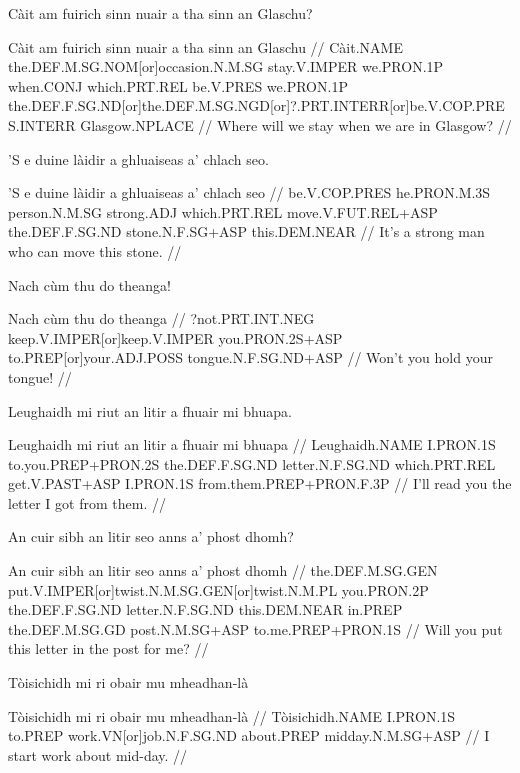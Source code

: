 \documentclass[a4paper,10pt]{article}
\begin{document}
\ex
\begingl
\glpre Càit am fuirich sinn nuair a tha sinn an Glaschu? 

\vspace{4mm}
\gla Càit am fuirich sinn nuair a tha sinn an Glaschu  //
\glb Càit.NAME the.DEF.M.SG.NOM[or]occasion.N.M.SG stay.V.IMPER we.PRON.1P when.CONJ which.PRT.REL be.V.PRES we.PRON.1P the.DEF.F.SG.ND[or]the.DEF.M.SG.NGD[or]?.PRT.INTERR[or]be.V.COP.PRES.INTERR Glasgow.NPLACE  //
\glft Where will we stay when we are in Glasgow? //
\endgl
\xe

\ex
\begingl
\glpre 'S e duine làidir a ghluaiseas a' chlach seo. 

\vspace{4mm}
\gla 'S e duine làidir a ghluaiseas a' chlach seo  //
\glb be.V.COP.PRES he.PRON.M.3S person.N.M.SG strong.ADJ which.PRT.REL move.V.FUT.REL+ASP the.DEF.F.SG.ND stone.N.F.SG+ASP this.DEM.NEAR  //
\glft It's a strong man who can move this stone. //
\endgl
\xe

\ex
\begingl
\glpre Nach cùm thu do theanga! 

\vspace{4mm}
\gla Nach cùm thu do theanga  //
\glb ?not.PRT.INT.NEG keep.V.IMPER[or]keep.V.IMPER you.PRON.2S+ASP to.PREP[or]your.ADJ.POSS tongue.N.F.SG.ND+ASP  //
\glft Won't you hold your tongue! //
\endgl
\xe

\ex
\begingl
\glpre Leughaidh mi riut an litir a fhuair mi bhuapa. 

\vspace{4mm}
\gla Leughaidh mi riut an litir a fhuair mi bhuapa  //
\glb Leughaidh.NAME I.PRON.1S to.you.PREP+PRON.2S the.DEF.F.SG.ND letter.N.F.SG.ND which.PRT.REL get.V.PAST+ASP I.PRON.1S from.them.PREP+PRON.F.3P  //
\glft I'll read you the letter I got from them. //
\endgl
\xe

\ex
\begingl
\glpre An cuir sibh an litir seo anns a' phost dhomh? 

\vspace{4mm}
\gla An cuir sibh an litir seo anns a' phost dhomh  //
\glb the.DEF.M.SG.GEN put.V.IMPER[or]twist.N.M.SG.GEN[or]twist.N.M.PL you.PRON.2P the.DEF.F.SG.ND letter.N.F.SG.ND this.DEM.NEAR in.PREP the.DEF.M.SG.GD post.N.M.SG+ASP to.me.PREP+PRON.1S  //
\glft Will you put this letter in the post for me? //
\endgl
\xe

\ex
\begingl
\glpre Tòisichidh mi ri obair mu mheadhan-là 

\vspace{4mm}
\gla Tòisichidh mi ri obair mu mheadhan-là  //
\glb Tòisichidh.NAME I.PRON.1S to.PREP work.VN[or]job.N.F.SG.ND about.PREP midday.N.M.SG+ASP  //
\glft I start work about mid-day. //
\endgl
\xe
\end{document}

